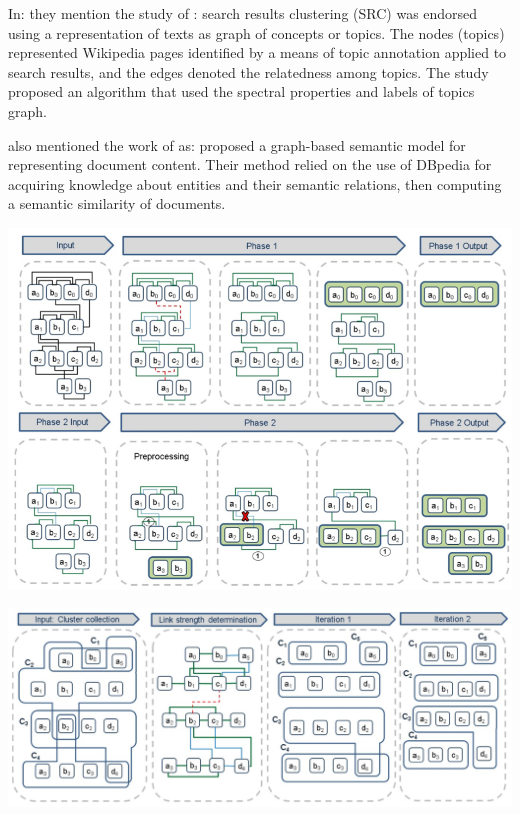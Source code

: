 \documentclass[runningheads]{llncs}
\begin{document}
In: \cite{Elbattah} they mention the study of \cite{Scaiella}: search results clustering (SRC) was endorsed using a representation of texts as graph of concepts or topics. The nodes (topics) represented Wikipedia pages identified by a means of topic annotation applied to search results, and the edges denoted the relatedness among topics. The study proposed an algorithm that used the spectral properties and labels of topics graph. 

\cite{Elbattah} also mentioned the work of \cite{Schuhmacher} as: proposed a graph-based semantic model for representing document content. Their method relied on the use of DBpedia for acquiring knowledge about entities and their semantic relations, then computing a semantic similarity of documents.


\begin{center}
\includegraphics[width=1\textwidth]{clip_example.png}
\end{center}

\begin{center}
\includegraphics[width=1\textwidth]{clip_overlap_resolution.png}
\end{center}
\end{document}
